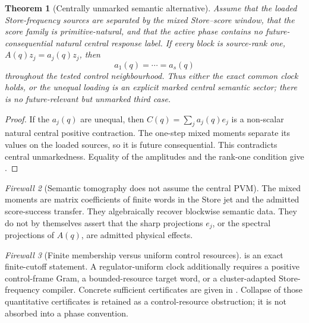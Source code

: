 \documentclass[11pt]{article}
\newtheorem{theorem}{Theorem}[section]
\theoremstyle{definition}
\theoremstyle{remark}
\newtheorem{firewall}[theorem]{Firewall}
\begin{document}
\begin{theorem}[Centrally unmarked semantic alternative]
\label{thm:no-unmarked-semantic-split-master}
Assume that the loaded Store-frequency sources are separated by the mixed
Store--score window, that the score family is primitive-natural, and that the
active phase contains no future-consequential natural central response label.
If every block is source-rank one,
$A(q)z_j=a_j(q)z_j$, then
\begin{equation}
  \boxed{a_1(q)=\cdots=a_s(q)}
  \label{eq:no-unmarked-semantic-split-master}
\end{equation}
throughout the tested control neighbourhood.  Thus either the exact common
clock holds, or the unequal loading is an explicit marked central semantic
sector; there is no future-relevant but unmarked third case.
\end{theorem}

\begin{proof}
If the $a_j(q)$ are unequal, then
$C(q)=\sum_ja_j(q)e_j$ is a non-scalar natural central positive contraction.
The one-step mixed moments separate its values on the loaded sources, so it is
future consequential.  This contradicts central unmarkedness.  Equality of the
amplitudes and the rank-one condition give
.
\end{proof}

\begin{firewall}[Semantic tomography does not assume the central PVM]
The mixed moments are matrix coefficients of finite words in the Store jet and
the admitted score-success transfer.  They algebraically recover blockwise
semantic data.  They do not by themselves assert that the sharp projections
$e_j$, or the spectral projections of $A(q)$, are admitted physical effects.
\end{firewall}


\begin{firewall}[Finite membership versus uniform control resources]
 is an exact finite-cutoff statement.
A regulator-uniform clock additionally requires a positive control-frame Gram,
a bounded-resource target word, or a cluster-adapted Store-frequency compiler.
Concrete sufficient certificates are given in
.
Collapse of those quantitative certificates is retained as a control-resource
obstruction; it is not absorbed into a phase convention.
\end{firewall}
\end{document}
